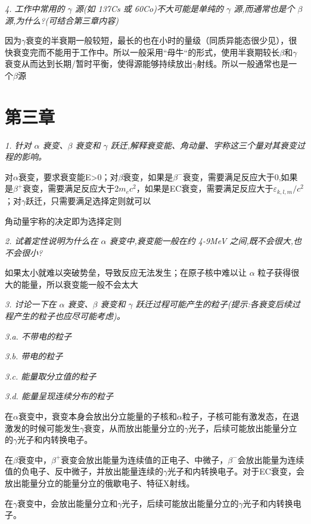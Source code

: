 \documentclass{article}
\begin{document}
\emph{4. 工作中常用的 $\gamma$ 源(如 137Cs 或 60Co)不大可能是单纯的 $\gamma$ 源,而通常也是个 $\beta$ 源,为什么?(可结合第三章内容)}

因为$\gamma$衰变的半衰期一般较短，最长的也在小时的量级（同质异能态很少见），很快衰变完而不能用于工作中。所以一般采用“母牛“的形式，使用半衰期较长$\beta$和$\gamma$衰变从而达到长期/暂时平衡，使得源能够持续放出$\gamma$射线。所以一般通常也是一个$\beta$源

\emph{}

\section*{第三章}

\emph{1. 针对 $\alpha$ 衰变、$\beta$ 衰变和 $\gamma$ 跃迁,解释衰变能、角动量、宇称这三个量对其衰变过程的影响。}

对$\alpha$衰变，要求衰变能E>0；对$\beta$衰变，如果是$\beta^-$衰变，需要满足反应大于0,如果是$\beta^+$衰变，需要满足反应大于2$m_ec^2$，如果是EC衰变，需要满足反应大于$\varepsilon_{k,l,m}/c^2$；对$\gamma$跃迁，只需要满足选择定则就可以

角动量宇称的决定即为选择定则

\emph{}

\emph{2. 试着定性说明为什么在 $\alpha$ 衰变中,衰变能一般在约 4-9MeV 之间,既不会很大,也不会很小?}

如果太小就难以突破势垒，导致反应无法发生；在原子核中难以让 $\alpha$ 粒子获得很大的能量，所以衰变能一般不会太大

\emph{}

\emph{3. 讨论一下在 $\alpha$ 衰变、$\beta$ 衰变和 $\gamma$ 跃迁过程可能产生的粒子(提示:各衰变后续过程产生的粒子也应尽可能考虑)。}

\emph{ 3.a. 不带电的粒子}

\emph{ 3.b. 带电的粒子}

\emph{ 3.c. 能量取分立值的粒子}

\emph{ 3.d. 能量呈现连续分布的粒子}

在$\alpha$衰变中，衰变本身会放出分立能量的子核和$\alpha$粒子，子核可能有激发态，在退激发的时候可能发生$\gamma$衰变，从而放出能量分立的$\gamma$光子，后续可能放出能量分立的$\gamma$光子和内转换电子。

在$\beta$衰变中，$\beta^+$衰变会放出能量为连续值的正电子、中微子，$\beta^-$会放出能量为连续值的负电子、反中微子，并放出能量连续的$\gamma$光子和内转换电子。对于EC衰变，会放出能量分立的能量分立的俄歇电子、特征X射线。

在$\gamma$衰变中，会放出能量分立和$\gamma$光子，后续可能放出能量分立的$\gamma$光子和内转换电子。
\end{document}
